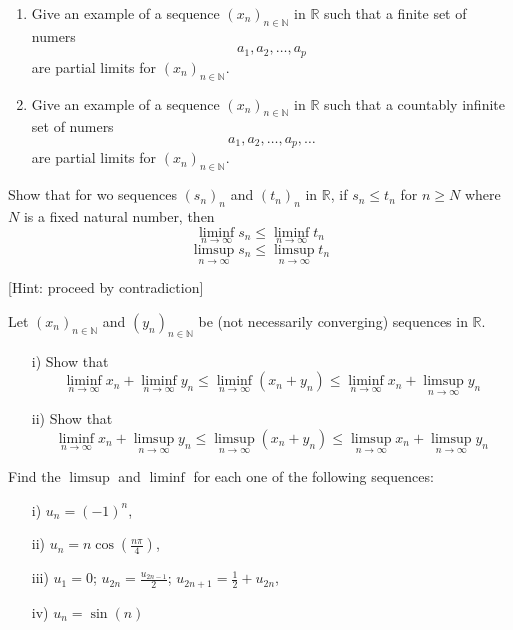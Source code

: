 \documentclass[11pt]{article}%
\newcommand{\R}{\mathbb{R}}
\begin{document}
\begin{Exercise}[title= *]  
\begin{enumerate}
	\item 

Give an example of a sequence $(x_n)_{n\in\mathbb{N}}$ in $\mathbb R$ such that a finite set of numers $$a_1,a_2,\ldots,a_p$$ are partial limits for $(x_n)_{n\in\mathbb{N}}$.

\item Give an example of a sequence $(x_n)_{n\in\mathbb{N}}$ in $\mathbb R$ such that a countably infinite set of numers $$a_1,a_2,\ldots,a_p, \ldots$$ are partial limits for $(x_n)_{n\in\mathbb{N}}$.
\end{enumerate}
\end{Exercise}

\begin{Exercise}[title=*$\dagger$]
	Show that for wo sequences $(s_n)_n$ and $(t_n)_n$ in $\R$, if $s_n\leq t_n$ for $n\geq N$ where $N$ is a fixed natural number, then
	$$\liminf_{n\to\infty} s_n \leq \liminf_{n\to\infty} t_n$$
	$$\limsup_{n\to\infty} s_n \leq \limsup_{n\to\infty} t_n$$
	
	[Hint: proceed by contradiction]
\end{Exercise}

\begin{Exercise}[title= **]
Let $(x_n)_{n\in\mathbb{N}}$ and $(y_n)_{n\in\mathbb{N}}$ be (not necessarily converging) sequences in $\mathbb{R}$.
\begin{itemize}
	\item[i)] Show that $$\liminf\limits_{n\to\infty}x_n+\liminf\limits_{n\to\infty}y_n\leq\liminf\limits_{n\to\infty}(x_n+y_n)\leq \liminf\limits_{n\to\infty}x_n+\limsup\limits_{n\to\infty}y_n$$
	\item[ii)] Show that $$\liminf\limits_{n\to\infty}x_n+\limsup\limits_{n\to\infty}y_n\leq\limsup\limits_{n\to\infty}(x_n+y_n)\leq \limsup\limits_{n\to\infty}x_n+\limsup\limits_{n\to\infty}y_n$$
\end{itemize}
\end{Exercise}


\begin{Exercise}[title=**$\dagger$]
Find the $\limsup$ and $\liminf$ for each one of the following sequences:
\begin{enumerate}
	\item[i)] $u_n=(-1)^n$,
	\item[ii)] $u_n=n\cos(\frac{n\pi}{4})$,
	\item[iii)] $u_1=0$; $u_{2n}=\frac{u_{2n-1}}{2}$; $u_{2n+1}=\frac{1}{2} + u_{2n}$,
	\item[iv)] $u_n=\sin(n)$
\end{enumerate}
\end{Exercise}
\end{document}
